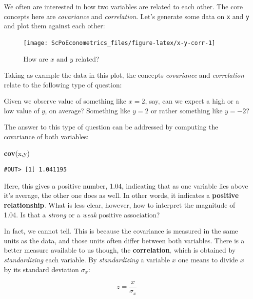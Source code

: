 \documentclass[]{book}
\newenvironment{Shaded}{\begin{snugshade}}{\end{snugshade}}
\newcommand{\KeywordTok}[1]{\textcolor[rgb]{0.13,0.29,0.53}{\textbf{#1}}}
\newcommand{\NormalTok}[1]{#1}
\newenvironment{note}{\begin{tcolorbox}[colback=blue!5!white,colframe=blue!75!black]}{\end{tcolorbox}}
\begin{document}
We often are interested in how two variables are related to each other. The core concepts here are \emph{covariance} and \emph{correlation}. Let's generate some data on \texttt{x} and \texttt{y} and plot them against each other:

\begin{figure}

{\centering \texttt{[image: ScPoEconometrics\_files/figure-latex/x-y-corr-1]} 

}

\caption{How are $x$ and $y$ related?}\label{fig:x-y-corr}
\end{figure}

Taking as example the data in this plot, the concepts \emph{covariance} and \emph{correlation} relate to the following type of question:

\begin{note}
Given we observe value of something like \(x=2\), say, can we expect a
high or a low value of \(y\), on average? Something like \(y=2\) or
rather something like \(y=-2\)?
\end{note}

The answer to this type of question can be addressed by computing the covariance of both variables:

\begin{Shaded}
\begin{Highlighting}[]
\KeywordTok{cov}\NormalTok{(x,y)  }
\end{Highlighting}
\end{Shaded}

\begin{verbatim}
#OUT> [1] 1.041195
\end{verbatim}

Here, this gives a positive number, 1.04, indicating that as one variable lies above it's average, the other one does as well. In other words, it indicates a \textbf{positive relationship}. What is less clear, however, how to interpret the magnitude of 1.04. Is that a \emph{strong} or a \emph{weak} positive association?

In fact, we cannot tell. This is because the covariance is measured in the same units as the data, and those units often differ between both variables. There is a better measure available to us though, the \textbf{correlation}, which is obtained by \emph{standardizing} each variable. By \emph{standardizing} a variable \(x\) one means to divide \(x\) by its standard deviation \(\sigma_x\):

\[
z = \frac{x}{\sigma_x}
\]
\end{document}
